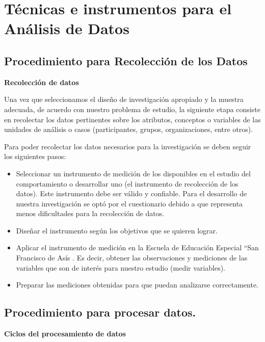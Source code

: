 \documentclass[12pt]{report}%
\begin{document}
\section{Técnicas e instrumentos para el Análisis de Datos}
\subsection{Procedimiento para Recolección de los Datos}

\textbf{Recolección de datos}

Una vez que seleccionamos el diseño de investigación apropiado y la muestra adecuada, de acuerdo con nuestro problema de estudio, la siguiente etapa consiste en recolectar los datos pertinentes sobre los atributos, conceptos o variables de las unidades de análisis o casos (participantes, grupos, organizaciones, entre otros). 

Para poder recolectar los datos necesarios para la investigación se deben seguir los siguientes pasos: 
\begin{itemize}
\item Seleccionar un instrumento de medición de los disponibles en el estudio del comportamiento o desarrollar uno (el instrumento de recolección de los datos). Este instrumento debe ser válido y confiable. Para el desarrollo de nuestra investigación se optó por el cuestionario debido a que representa menos dificultades para la recolección de datos.
\item  Diseñar el instrumento según los objetivos que se quieren lograr.
\item  Aplicar el instrumento de medición en la Escuela de Educación Especial “San Francisco de Asís . Es decir, obtener las observaciones y mediciones de las variables que son de interés para nuestro estudio (medir variables). 
\item Preparar las mediciones obtenidas para que puedan analizarse correctamente.
\end{itemize}

\subsection{Procedimiento para procesar datos.}

\textbf{Ciclos del procesamiento de datos} 
\end{document}
